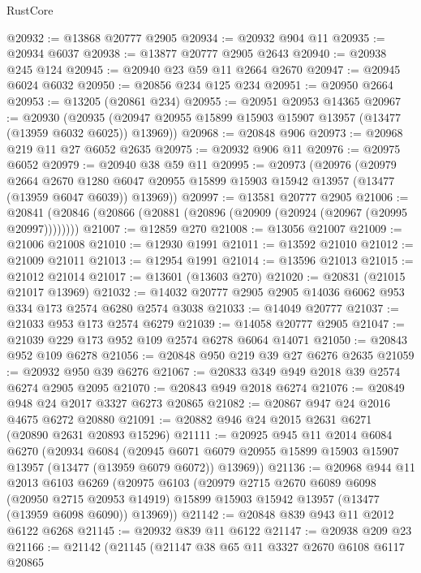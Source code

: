 \begin{lexlean}{RustCore}
\begin{coremodule}
@20932 := @13868 @20777 @2905
@20934 := @20932 @904 @11
@20935 := @20934 @6037
@20938 := @13877 @20777 @2905 @2643
@20940 := @20938 @245 @124
@20945 := @20940 @23 @59 @11 @2664 @2670
@20947 := @20945 @6024 @6032
@20950 := @20856 @234 @125 @234
@20951 := @20950 @2664
@20953 := @13205 (@20861 @234)
@20955 := @20951 @20953 @14365
@20967 := @20930
    (@20935 (@20947 @20955 @15899 @15903 @15907 @13957 (@13477 (@13959 @6032 @6025)) @13969))
@20968 := @20848 @906
@20973 := @20968 @219 @11 @27 @6052 @2635
@20975 := @20932 @906 @11
@20976 := @20975 @6052
@20979 := @20940 @38 @59 @11
@20995 := @20973
    (@20976
      (@20979
        @2664
        @2670
        @1280
        @6047
        @20955
        @15899
        @15903
        @15942
        @13957
        (@13477 (@13959 @6047 @6039))
        @13969))
@20997 := @13581 @20777 @2905
@21006 := @20841 (@20846 (@20866 (@20881 (@20896 (@20909 (@20924 (@20967 (@20995 @20997))))))))
@21007 := @12859 @270
@21008 := @13056 @21007
@21009 := @21006 @21008
@21010 := @12930 @1991
@21011 := @13592 @21010
@21012 := @21009 @21011
@21013 := @12954 @1991
@21014 := @13596 @21013
@21015 := @21012 @21014
@21017 := @13601 (@13603 @270)
@21020 := @20831 (@21015 @21017 @13969)
@21032 := @14032 @20777 @2905 @2905 @14036 @6062 @953 @334 @173 @2574 @6280 @2574 @3038
@21033 := @14049 @20777
@21037 := @21033 @953 @173 @2574 @6279
@21039 := @14058 @20777 @2905
@21047 := @21039 @229 @173 @952 @109 @2574 @6278 @6064 @14071
@21050 := @20843 @952 @109 @6278
@21056 := @20848 @950 @219 @39 @27 @6276 @2635
@21059 := @20932 @950 @39 @6276
@21067 := @20833 @349 @949 @2018 @39 @2574 @6274 @2905 @2095
@21070 := @20843 @949 @2018 @6274
@21076 := @20849 @948 @24 @2017 @3327 @6273 @20865
@21082 := @20867 @947 @24 @2016 @4675 @6272 @20880
@21091 := @20882 @946 @24 @2015 @2631 @6271 (@20890 @2631 @20893 @15296)
@21111 := @20925
    @945
    @11
    @2014
    @6084
    @6270
    (@20934
      @6084
      (@20945 @6071 @6079 @20955 @15899 @15903 @15907 @13957 (@13477 (@13959 @6079 @6072)) @13969))
@21136 := @20968
    @944
    @11
    @2013
    @6103
    @6269
    (@20975
      @6103
      (@20979
        @2715
        @2670
        @6089
        @6098
        (@20950 @2715 @20953 @14919)
        @15899
        @15903
        @15942
        @13957
        (@13477 (@13959 @6098 @6090))
        @13969))
@21142 := @20848 @839 @943 @11 @2012 @6122 @6268
@21145 := @20932 @839 @11 @6122
@21147 := @20938 @209 @23
@21166 := @21142
    (@21145
      (@21147
        @38
        @65
        @11
        @3327
        @2670
        @6108
        @6117
        @20865

\end{coremodule}
\end{lexlean}
